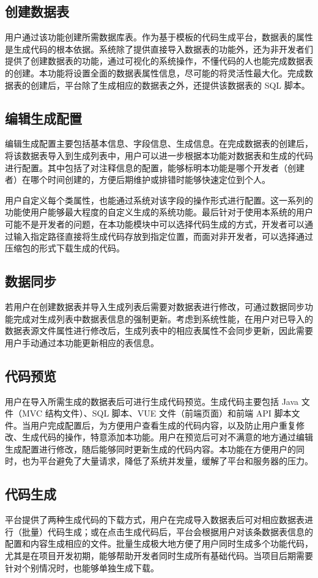 \documentclass{izdthesis}
\begin{document}
\subsection{创建数据表}
用户通过该功能创建所需数据库表。作为基于模板的代码生成平台，数据表的属性是生成代码的根本依据。系统除了提供直接导入数据表的功能外，还为非开发者们提供了创建数据表的功能，通过可视化的系统操作，不懂代码的人也能完成数据表的创建。本功能将设置全面的数据表属性信息，尽可能的将灵活性最大化。完成数据表的创建后，平台除了生成相应的数据表之外，还提供该数据表的 SQL 脚本。

\subsection{编辑生成配置}
编辑生成配置主要包括基本信息、字段信息、生成信息。在完成数据表的创建后，将该数据表导入到生成列表中，用户可以进一步根据本功能对数据表和生成的代码进行配置。其中包括了对注释信息的配置，能够标明本功能是哪个开发者（创建者）在哪个时间创建的，方便后期维护或排错时能够快速定位到个人。

用户自定义每个类属性，也能通过系统对该字段的操作形式进行配置。这一系列的功能使用户能够最大程度的自定义生成的系统功能。最后针对于使用本系统的用户可能不是开发者的问题，在本功能模块中可以选择代码生成的方式，开发者可以通过输入指定路径直接将生成代码存放到指定位置，而面对非开发者，可以选择通过压缩包的形式下载生成的代码。

\subsection{数据同步}
若用户在创建数据表并导入生成列表后需要对数据表进行修改，可通过数据同步功能完成对生成列表中数据表信息的强制更新。考虑到系统性能，在用户对已导入的数据表源文件属性进行修改后，生成列表中的相应表属性不会同步更新，因此需要用户手动通过本功能更新相应的表信息。

\subsection{代码预览}
用户在导入所需生成的数据表后可进行生成代码预览。生成代码主要包括 Java 文件（MVC 结构文件）、SQL 脚本、VUE 文件（前端页面）和前端 API 脚本文件。当用户完成配置后，为方便用户查看生成的代码内容，以及防止用户重复修改、生成代码的操作，特意添加本功能。用户在预览后可对不满意的地方通过编辑生成配置进行修改，随后能够同时更新生成的代码内容。本功能在方便用户的同时，也为平台避免了大量请求，降低了系统并发量，缓解了平台和服务器的压力。

\subsection{代码生成}
平台提供了两种生成代码的下载方式，用户在完成导入数据表后可对相应数据表进行（批量）代码生成；或在点击生成代码后，平台会根据用户对该条数据表信息的配置和内容生成相应的文件。批量生成极大地方便了用户同时生成多个功能代码，尤其是在项目开发初期，能够帮助开发者同时生成所有基础代码。当项目后期需要针对个别情况时，也能够单独生成下载。
\end{document}
